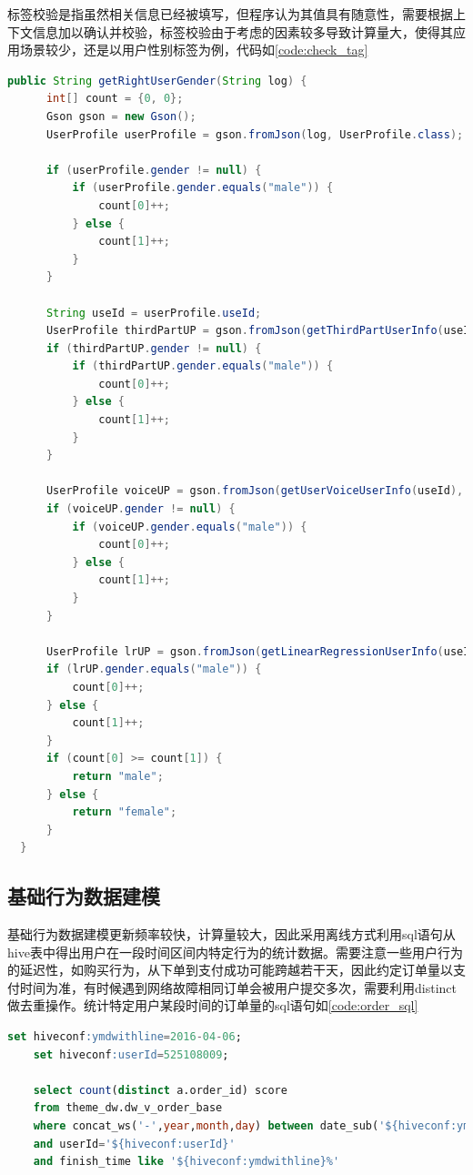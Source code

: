   标签校验是指虽然相关信息已经被填写，但程序认为其值具有随意性，需要根据上下文信息加以确认并校验，标签校验由于考虑的因素较多导致计算量大，使得其应用场景较少，还是以用户性别标签为例，代码如\autoref{code:check_tag}
  \begin{lstlisting}[language=java,firstnumber=1,label={code:check_tag}]
      public String getRightUserGender(String log) {
      int[] count = {0, 0};
      Gson gson = new Gson();
      UserProfile userProfile = gson.fromJson(log, UserProfile.class);

      if (userProfile.gender != null) {
          if (userProfile.gender.equals("male")) {
              count[0]++;
          } else {
              count[1]++;
          }
      }

      String useId = userProfile.useId;
      UserProfile thirdPartUP = gson.fromJson(getThirdPartUserInfo(useId), UserProfile.class);
      if (thirdPartUP.gender != null) {
          if (thirdPartUP.gender.equals("male")) {
              count[0]++;
          } else {
              count[1]++;
          }
      }

      UserProfile voiceUP = gson.fromJson(getUserVoiceUserInfo(useId), UserProfile.class);
      if (voiceUP.gender != null) {
          if (voiceUP.gender.equals("male")) {
              count[0]++;
          } else {
              count[1]++;
          }
      }

      UserProfile lrUP = gson.fromJson(getLinearRegressionUserInfo(useId), UserProfile.class);
      if (lrUP.gender.equals("male")) {
          count[0]++;
      } else {
          count[1]++;
      }
      if (count[0] >= count[1]) {
          return "male";
      } else {
          return "female";
      }
  }
  \end{lstlisting}

  \subsection{基础行为数据建模}
  基础行为数据建模更新频率较快，计算量较大，因此采用离线方式利用sql语句从hive表中得出用户在一段时间区间内特定行为的统计数据。需要注意一些用户行为的延迟性，如购买行为，从下单到支付成功可能跨越若干天，因此约定订单量以支付时间为准，有时候遇到网络故障相同订单会被用户提交多次，需要利用distinct做去重操作。统计特定用户某段时间的订单量的sql语句如\autoref{code:order_sql}
  \begin{lstlisting}[language=SQL,firstnumber=1,label={code:order_sql}]
    set hiveconf:ymdwithline=2016-04-06;
    set hiveconf:userId=525108009;

    select count(distinct a.order_id) score
    from theme_dw.dw_v_order_base
    where concat_ws('-',year,month,day) between date_sub('${hiveconf:ymdwithline}',5) and '${hiveconf:ymdwithline}'
    and userId='${hiveconf:userId}'
    and finish_time like '${hiveconf:ymdwithline}%'
  \end{lstlisting}

